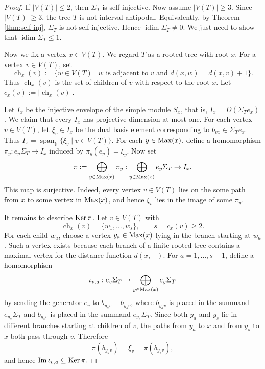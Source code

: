 \documentclass[a4paper,leqno]{amsart}
\begin{document}
\begin{proof}
If $|V(T)|\leq 2$, then $\Sigma_T$ is self-injective. Now assume $|V(T)|\geq 3$. Since $|V(T)|\geq 3$, the tree $T$ is not interval-antipodal. Equivalently, by Theorem \ref{thm:self-inj}, $\Sigma_T$ is not self-injective. Hence
$\operatorname{idim}\Sigma_T\neq 0$. We just need to show that $\operatorname{idim}\Sigma_T\leq 1$. 

Now we fix a vertex $x\in V(T)$. We regard $T$ as a rooted tree with root $x$. For a vertex $v\in V(T)$, set
$$\operatorname{ch}_x(v):=\{w\in V(T)\mid w \text{ is adjacent to } v\text{ and } d(x,w)=d(x,v)+1\}.$$
Thus $\operatorname{ch}_x(v)$ is the set of children of $v$ with respect to the root $x$. Let $c_x(v):=|\operatorname{ch}_x(v)|$.

Let $I_x$ be the injective envelope of the simple module $S_x$, that is, $I_x=D(\Sigma_Te_x)$. We claim that every $I_x$ has projective dimension at most one.  For each vertex $v\in V(T)$, let $\xi_v\in I_x$ be the dual basis element corresponding to $b_{vx}\in \Sigma_Te_x$. Thus $I_x=\operatorname{span}_{\Bbbk}\{\xi_v\mid v\in V(T)\}$. For each $y\in \operatorname{Max}(x)$, define a homomorphism $\pi_y:e_y\Sigma_T\to I_x$ induced by $\pi_y(e_y)=\xi_y$. Now set
$$\pi:=\bigoplus_{y\in \operatorname{Max}(x)}\pi_y:\bigoplus_{y\in \operatorname{Max}(x)}e_y\Sigma_T\to I_x.$$
This map is surjective. Indeed, every vertex $v\in V(T)$ lies on the some path from $x$ to some vertex in $\operatorname{Max}(x)$, and hence $\xi_v$ lies in the image of some $\pi_y$.

It remains to describe $\operatorname{Ker}\pi$. Let $v\in V(T)$ with
$$\operatorname{ch}_x(v)=\{w_1,\dots,w_s\},\qquad s=c_x(v)\geq 2.$$
For each child $w_a$, choose a vertex $y_a\in \operatorname{Max}(x)$ lying in the branch starting at $w_a$. Such a vertex exists because each branch of a finite rooted tree contains a maximal vertex for the distance function $d(x,-)$. For $a=1,\dots,s-1$, define a homomorphism
$$\iota_{v,a}:e_v\Sigma_T\to \bigoplus_{y\in \operatorname{Max}(x)}e_y\Sigma_T$$
by sending the generator $e_v$ to $b_{y_av}-b_{y_sv}$, where $b_{y_av}$ is placed in the summand $e_{y_a}\Sigma_T$ and $b_{y_sv}$ is placed in the summand $e_{y_s}\Sigma_T$. Since both $y_a$ and $y_s$ lie in different branches starting at children of $v$, the paths from $y_a$ to $x$ and from $y_s$ to $x$ both pass through $v$. Therefore
$$\pi(b_{y_av})=\xi_v=\pi(b_{y_sv}),$$
and hence $\operatorname{Im}\iota_{v,a}\subseteq \operatorname{Ker}\pi.$


\end{proof}
\end{document}
